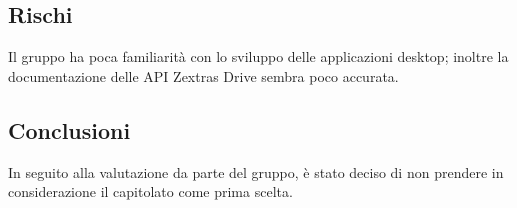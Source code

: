 \documentclass[../studio-di-fattibilita.tex]{subfiles}
\begin{document}
\subsection{Rischi}%
\label{sub:rischi}
Il gruppo ha poca familiarità con lo sviluppo delle applicazioni desktop; inoltre la documentazione delle API Zextras Drive sembra poco accurata.
\subsection{Conclusioni}%
\label{sub:Conclusioni}
In seguito alla valutazione da parte del gruppo, è stato deciso di non prendere in considerazione il capitolato come prima scelta.
\end{document}

